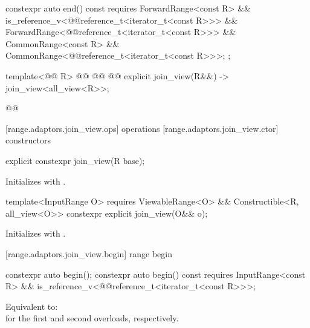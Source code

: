 {\begin{codeblock}
{{    constexpr auto end() const requires ForwardRange<const R> &&
      is_reference_v<@@reference_t<iterator_t<const R>>> &&
      ForwardRange<@@reference_t<iterator_t<const R>>> &&
      CommonRange<const R> && CommonRange<@@reference_t<iterator_t<const R>>>;
  };

  template<@@ R>
    @@
      @@
      @@
    explicit join_view(R&&) -> join_view<all_view<R>>;
}@\oldtxt{\}}@
\end{codeblock}

[range.adaptors.join_view.ops]{ operations}
[range.adaptors.join_view.ctor]{ constructors}

%
\begin{itemdecl}
explicit constexpr join_view(R base);
\end{itemdecl}

\begin{itemdescr}
\pnum
\effects Initializes  with .
\end{itemdescr}

%
\begin{itemdecl}
template<InputRange O>
  requires ViewableRange<O> && Constructible<R, all_view<O>>
constexpr explicit join_view(O&& o);
\end{itemdecl}

\begin{itemdescr}
\pnum
\effects Initializes  with .
\end{itemdescr}

[range.adaptors.join_view.begin]{ range begin}

%
\begin{itemdecl}
constexpr auto begin();
constexpr auto begin() const requires InputRange<const R> &&
  is_reference_v<@@reference_t<iterator_t<const R>>>;
\end{itemdecl}

\begin{itemdescr}
\pnum
\effects Equivalent to:
 \\
for the first and second overloads, respectively.
\end{itemdescr}

}
